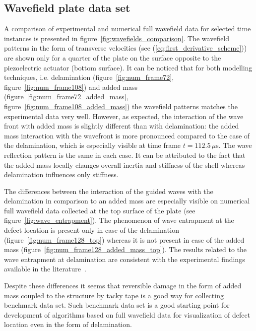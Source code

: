 \documentclass[12pt]{iopart}
\begin{document}
\subsection{Wavefield plate data set }
A comparison of experimental and numerical full wavefield data for selected time instances is presented in figure~\ref{fig:wavefields_comparison}. The wavefield patterns in the form of transverse velocities (see (\ref{eq:first_derivative_scheme})) are shown only for a quarter of the plate on the surface opposite to the piezoelectric actuator (bottom surface). It can be noticed that for both modelling techniques, i.e. delamination (figure~\ref{fig:num_frame72}, figure~\ref{fig:num_frame108}) and added mass (figure~\ref{fig:num_frame72_added_mass}, figure~\ref{fig:num_frame108_added_mass})	the wavefield patterns matches the experimental data very well. However, as expected, the interaction of the wave front with added mass is slightly different than with delamination: the added mass interaction with the wavefront is more pronounced compared to the case of the delamination, which is especially visible at time frame $t=112.5\,  \mu$s. The wave reflection pattern is the same in each case. It can be attributed to the fact that the added mass locally changes overall inertia and stiffness of the shell whereas delamination influences only stiffness. 

The differences between the interaction of the guided waves with the delamination in comparison to an added mass are especially visible on numerical full wavefield data collected at the top surface of the plate (see figure~\ref{fig:wave_entrapment}). The phenomenon of wave entrapment at the defect location is present only in case of the delamination (figure~\ref{fig:num_frame128_top}) whereas it is not present in case of the added mass (figure~\ref{fig:num_frame128_added_mass_top}). The results related to the wave entrapment at delamination are consistent with the experimental findings available in the literature~\cite{Glushkov2012}. 

Despite these differences it seems that reversible damage in the form of added mass coupled to the structure by tacky tape is a good way for collecting benchmark data set. Such benchmark data set is a good starting point for development of algorithms based on full wavefield data for visualization of defect location even in the form of delamination.
\end{document}

